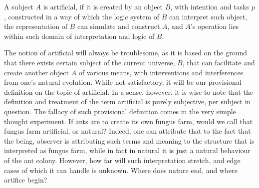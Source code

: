 \begin{definition}[Artificial]
    A subject $A$ is artificial, if it is created by an object $B$, with intention and tasks $p$, constructed in a way of which the logic system of $B$ can interpret such object, the representation of $B$ can simulate and construct $A$, and $A$'s operation lies within such domain of interpretation and logic of $B$. 
\end{definition}

The notion of artificial will always be troublesome, as it is based on the ground that there exists certain subject of the current universe, $B$, that can facilitate and create another object $A$ of various means, with interventions and interferences from one's natural evolution. While not satisfactory, it will be our provisional definition on the topic of artificial. In a sense, however, it is wise to note that the definition and treatment of the term artificial is purely subjective, per subject in question. The fallacy of such provisional definition comes in the very simple thought experiment. If ants are to create its own fungus farm, would we call that fungus farm artificial, or natural? Indeed, one can attribute that to the fact that the being, observer is attributing such terms and meaning to the structure that is interpreted as fungus farm, while in fact in natural it is just a natural behaviour of the ant colony. However, how far will such interpretation stretch, and edge cases of which it can handle is unknown. Where does nature end, and where artifice begin?

